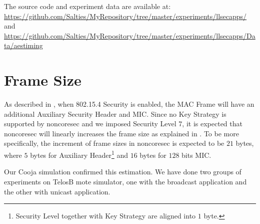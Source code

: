
The source code and experiment data are available at:\\
\url{https://github.com/Salties/MyRepository/tree/master/experiments/llsecapps/} \\
and \\
\url{https://github.com/Salties/MyRepository/tree/master/experiments/llsecapps/Data/aestiming}

%
%

\section{Frame Size} \label{noncoresec frame size}

As described in , when 802.15.4 Security is enabled, the MAC Frame will have an additional Auxiliary Security Header and MIC. Since no Key Strategy is supported by noncoresec and we imposed Security Level $7$, it is expected that noncoresec will linearly increases the frame size as explained in . To be more specifically, the increment of frame sizes in noncoresec is expected to be $21$ bytes, where $5$ bytes for Auxiliary Header\footnote{Security Level together with Key Strategy are aligned into $1$ byte.} and $16$ bytes for $128$ bits MIC.

Our Cooja simulation confirmed this estimation. We have done two groups of experiments on TelosB mote simulator, one with the broadcast application and the other with unicast application.


